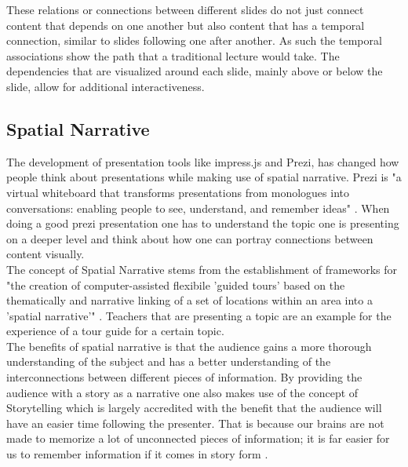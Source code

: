 \documentclass[twoside, 12pt]{article}
\begin{document}
These relations or connections between different slides do not just connect content that depends on one another but also content that has a temporal connection, similar to slides following one after another. As such the temporal associations show the path that a traditional lecture would take. The dependencies that are visualized around each slide, mainly above or below the slide, allow for additional interactiveness.\\

\subsection{Spatial Narrative}
\label{sec:spatialnarrative}

The development of presentation tools like impress.js and Prezi, has changed how people think about presentations while making use of spatial narrative. Prezi is "a virtual whiteboard that transforms presentations from monologues into conversations: enabling people to see, understand, and remember ideas" \cite{Prezi:npentrel14}. When doing a good prezi presentation one has to understand the topic one is presenting on a deeper level and think about how one can portray connections between content visually.\\

The concept of Spatial Narrative stems from the establishment of frameworks for "the creation of computer-assisted flexibile 'guided tours' based on the thematically and narrative linking of a set of locations within an area into a 'spatial narrative'" \cite{SpatialNarratives:npentrel14}. Teachers that are presenting a topic are an example for the experience of a tour guide for a certain topic.\\

The benefits of spatial narrative is that the audience gains a more thorough understanding of the subject and has a better understanding of the interconnections between different pieces of information. By providing the audience with a story as a narrative one also makes use of the concept of Storytelling which is largely accredited with the benefit that the audience will have an easier time following the presenter. That is because our brains are not made to memorize a lot of unconnected pieces of information; it is far easier for us to remember information if it comes in story form \cite{Storytelling:npentrel14}.\\
\end{document}
